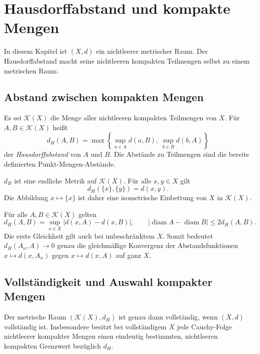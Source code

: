 \chapter{Hausdorffabstand und kompakte Mengen}
\label{b47guide:ch:hausdorff}

In diesem Kapitel ist $(X,d)$ ein nichtleerer metrischer Raum.
Der Hausdorffabstand macht seine nichtleeren kompakten Teilmengen
selbst zu einem metrischen Raum.

\section{Abstand zwischen kompakten Mengen}

\begin{definition}[Hausdorffabstand]
\label{b47guide:def:hausdorff}
Es sei $\mathcal K(X)$ die Menge aller nichtleeren kompakten Teilmengen
von $X$. Für $A,B\in\mathcal K(X)$ heißt
\[
 d_H(A,B)=\max\left\{
   \sup_{a\in A}d(a,B),\ \sup_{b\in B}d(b,A)
 \right\}
\]
der \emph{Hausdorffabstand} von $A$ und $B$. Die Abstände zu Teilmengen
sind die bereits definierten Punkt-Mengen-Abstände.
\end{definition}

\begin{theorem}
\label{b47guide:thm:hausdorff-metric}
$d_H$ ist eine endliche Metrik auf $\mathcal K(X)$.
Für alle $x,y\in X$ gilt
\[
 d_H(\{x\},\{y\})=d(x,y).
\]
Die Abbildung $x\mapsto\{x\}$ ist daher eine isometrische Einbettung
von $X$ in $\mathcal K(X)$. \cite{hausdorff-notes}
\end{theorem}

\begin{theorem}
\label{b47guide:thm:hausdorff-distances}
Für alle $A,B\in\mathcal K(X)$ gelten
\[
 d_H(A,B)=\sup_{x\in X}|d(x,A)-d(x,B)|,
 \qquad
 |\operatorname{diam}A-\operatorname{diam}B|\leq2d_H(A,B).
\]
Die erste Gleichheit gilt auch bei unbeschränktem $X$.
Somit bedeutet $d_H(A_n,A)\to0$ genau die gleichmäßige Konvergenz
der Abstandsfunktionen $x\mapsto d(x,A_n)$ gegen $x\mapsto d(x,A)$
auf ganz $X$. \cite{hausdorff-distance}
\end{theorem}

\section{Vollständigkeit und Auswahl kompakter Mengen}

\begin{theorem}
\label{b47guide:thm:hausdorff-complete}
Der metrische Raum $(\mathcal K(X),d_H)$ ist genau dann vollständig,
wenn $(X,d)$ vollständig ist.
Insbesondere besitzt bei vollständigem $X$ jede Cauchy-Folge
nichtleerer kompakter Mengen einen eindeutig bestimmten,
nichtleeren kompakten Grenzwert bezüglich $d_H$.
\cite{hausdorff-notes}
\end{theorem}

